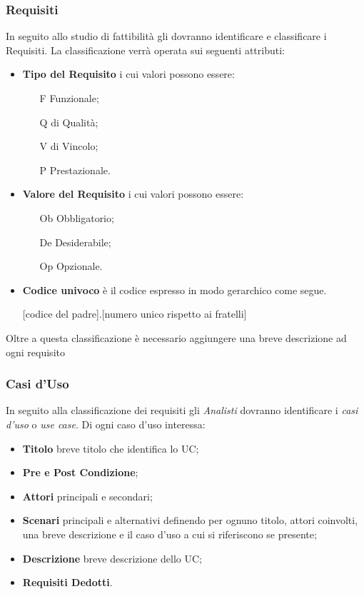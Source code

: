 \subsubsection{Requisiti}
In seguito allo studio di fattibilità gli \ruoloAnalista dovranno identificare e classificare i Requisiti.
La classificazione verrà operata sui seguenti attributi:
\begin{itemize}
\item \textbf{Tipo del Requisito} i cui valori possono essere:
\begin{itemize}
\item[F] Funzionale;
\item[Q] di Qualità;
\item[V] di Vincolo;
\item[P] Prestazionale.
\end{itemize}
\item \textbf{Valore del Requisito} i cui valori possono essere:
\begin{itemize}
\item[Ob] Obbligatorio;
\item[De] Desiderabile;
\item[Op] Opzionale.
\end{itemize}
\item \textbf{Codice univoco} è il codice espresso in modo gerarchico come segue.
\begin{center}
[codice del padre].[numero unico rispetto ai fratelli]
\end{center}
\end{itemize} 
Oltre a questa classificazione è necessario aggiungere una breve descrizione ad ogni requisito
\subsubsection{Casi d'Uso}
In seguito alla classificazione dei requisiti gli \textit{Analisti} dovranno identificare i \textit{casi d'uso} o \textit{use case}.
Di ogni caso d'uso interessa:
\begin{itemize}
\item \textbf{Titolo} breve titolo che identifica lo UC;
\item \textbf{Pre e Post Condizione};
\item \textbf{Attori} principali e secondari;
\item \textbf{Scenari} principali e alternativi definendo per ognuno titolo, attori coinvolti, una breve descrizione e il caso d'uso a cui si riferiscono se presente;
\item \textbf{Descrizione} breve descrizione dello UC;
\item \textbf{Requisiti Dedotti}.
\end{itemize} 

